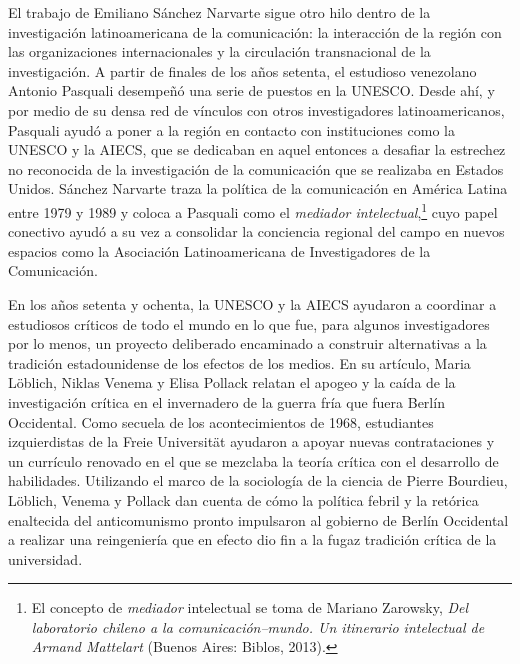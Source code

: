 \documentclass{tufte-handout}
\begin{document}
El trabajo de Emiliano Sánchez Narvarte sigue otro hilo dentro de la
investigación latinoamericana de la comunicación: la interacción de la
región con las organizaciones internacionales y la circulación
transnacional de la investigación. A partir de finales de los años
setenta, el estudioso venezolano Antonio Pasquali desempeñó una serie de
puestos en la UNESCO. Desde ahí, y por medio de su densa red de vínculos
con otros investigadores latinoamericanos, Pasquali ayudó a poner a la
región en contacto con instituciones como la UNESCO y la AIECS, que se
dedicaban en aquel entonces a desafiar la estrechez no reconocida de la
investigación de la comunicación que se realizaba en Estados Unidos.
Sánchez Narvarte traza la política de la comunicación en América Latina
entre 1979 y 1989 y coloca a Pasquali como el \emph{mediador
intelectual},\footnote{El concepto de \emph{mediador} intelectual se
  toma de Mariano Zarowsky, \emph{Del laboratorio chileno a la
  comunicación--mundo. Un itinerario intelectual de Armand Mattelart}
  (Buenos Aires: Biblos, 2013).} cuyo papel conectivo ayudó a su vez a
consolidar la conciencia regional del campo en nuevos espacios como la
Asociación Latinoamericana de Investigadores de la Comunicación.

En los años setenta y ochenta, la UNESCO y la AIECS ayudaron a coordinar
a estudiosos críticos de todo el mundo en lo que fue, para algunos
investigadores por lo menos, un proyecto deliberado encaminado a
construir alternativas a la tradición estadounidense de los efectos de
los medios. En su artículo, Maria Löblich, Niklas Venema y Elisa Pollack
relatan el apogeo y la caída de la investigación crítica en el
invernadero de la guerra fría que fuera Berlín Occidental. Como secuela
de los acontecimientos de 1968, estudiantes izquierdistas de la Freie
Universität ayudaron a apoyar nuevas contrataciones y un currículo
renovado en el que se mezclaba la teoría crítica con el desarrollo de
habilidades. Utilizando el marco de la sociología de la ciencia de
Pierre Bourdieu, Löblich, Venema y Pollack dan cuenta de cómo la
política febril y la retórica enaltecida del anticomunismo pronto
impulsaron al gobierno de Berlín Occidental a realizar una reingeniería
que en efecto dio fin a la fugaz tradición crítica de la universidad.
\end{document}
